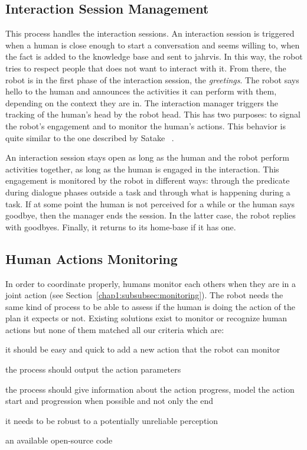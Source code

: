 \documentclass[a4paper,11pt,twoside]{StyleThese}
\begin{document}
\subsection{Interaction Session Management} 
This process handles the interaction sessions. An interaction session is triggered when a human is close enough to start a conversation and seems willing to, \ie when the fact   is added to the knowledge base and sent to \acrshort{jahrvis}. In this way, the robot tries to respect people that does not want to interact with it. From there, the robot is in the first phase of the interaction session, the \textit{greetings}. The robot says hello to the human and announces the activities it can perform with them, depending on the context they are in. The interaction manager triggers the tracking of the human's head by the robot head. This has two purposes: to signal the robot's engagement and to monitor the human's actions. This behavior is quite similar to the one described by Satake \etal~\cite{satake_2015_should}. 

An interaction session stays open as long as the human and the robot perform activities together, \ie as long as the human is engaged in the interaction. This engagement is monitored by the robot in different ways: through the predicate  during dialogue phases outside a task and through what is happening during a task. If at some point the human is not perceived for a while or the human says goodbye, then the manager ends the session. In the latter case, the robot replies with goodbyes. Finally, it returns to its home-base if it has one.


\subsection{Human Actions Monitoring}\label{chap2:subsec:h_moni}
In order to coordinate properly, humans monitor each others when they are in a joint action (see Section~\ref{chap1:subsubsec:monitoring}). The robot needs the same kind of process to be able to assess if the human is doing the action of the plan it expects or not. Existing solutions exist to monitor or recognize human actions but none of them matched all our criteria which are: 
\begin{bulletList}
	\item it should be easy and quick to add a new action that the robot can monitor
	\item the process should output the action parameters
	\item the process should give information about the action progress, \ie model the action start and progression when possible and not only the end
	\item it needs to be robust to a potentially unreliable perception
	\item an available open-source code 
\end{bulletList}
\end{document}

